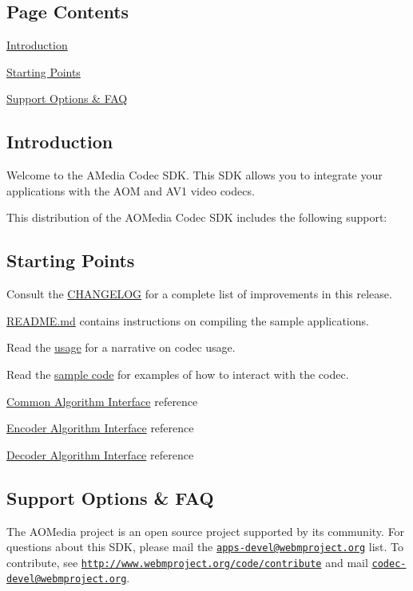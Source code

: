 \hypertarget{index_main_contents}{}\subsection{Page Contents}\label{index_main_contents}

\begin{DoxyItemize}
\item \hyperlink{index_main_intro}{Introduction}
\item \hyperlink{index_main_startpoints}{Starting Points}
\item \hyperlink{index_main_support}{Support Options \& F\+AQ}
\end{DoxyItemize}\hypertarget{index_main_intro}{}\subsection{Introduction}\label{index_main_intro}
Welcome to the A\+Media Codec S\+DK. This S\+DK allows you to integrate your applications with the A\+OM and A\+V1 video codecs.

This distribution of the A\+O\+Media Codec S\+DK includes the following support\+:\hypertarget{index_main_startpoints}{}\subsection{Starting Points}\label{index_main_startpoints}

\begin{DoxyItemize}
\item Consult the \hyperlink{changelog}{C\+H\+A\+N\+G\+E\+L\+OG} for a complete list of improvements in this release.
\item \hyperlink{readme}{R\+E\+A\+D\+M\+E.\+md} contains instructions on compiling the sample applications.
\item Read the \hyperlink{usage}{usage} for a narrative on codec usage.
\item Read the \hyperlink{samples}{sample code} for examples of how to interact with the codec.
\item \hyperlink{group__codec}{Common Algorithm Interface} reference
\item \hyperlink{group__encoder}{Encoder Algorithm Interface} reference
\item \hyperlink{group__decoder}{Decoder Algorithm Interface} reference
\end{DoxyItemize}\hypertarget{index_main_support}{}\subsection{Support Options \& F\+AQ}\label{index_main_support}
The A\+O\+Media project is an open source project supported by its community. For questions about this S\+DK, please mail the \href{mailto:apps-devel@webmproject.org}{\tt apps-\/devel@webmproject.\+org} list. To contribute, see \href{http://www.webmproject.org/code/contribute}{\tt http\+://www.\+webmproject.\+org/code/contribute} and mail \href{mailto:codec-devel@webmproject.org}{\tt codec-\/devel@webmproject.\+org}. 